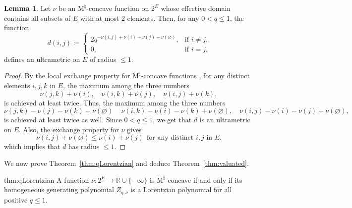 \documentclass{amsart}
\theoremstyle{definition}
\newtheorem{lemma}[theorem]{Lemma}
\theoremstyle{remark}
\newcommand{\1}{\mathbf{1}}
\newcommand{\Mnat}{$\text{M}^\natural$}
\numberwithin{equation}{section}
\begin{document}
\begin{lemma}\label{lem:ultra}
Let $\nu$ be an \Mnat-concave function on $2^E$ whose effective domain contains all subsets of $E$ with at most $2$ elements. Then,  for any $0<q\leq 1$, the function
  \[
  d(i,j)\coloneqq 
  \begin{cases}
  2q^{-\nu(i,j)+\nu(i)+\nu(j)-\nu(\varnothing)}, & \text{if $i\neq j$,}\\
  0, & \text{if $i=j$,}
  \end{cases}
  \]
  defines an ultrametric on $E$ of radius $\le 1$. %
\end{lemma}
\begin{proof}
  By the local exchange property for \Mnat-concave functions \cite[Theorem 6.4]{Mu03}, for any distinct elements $i,j,k$ in $E$, the maximum among the three numbers
  \[
    \nu(j,k)+\nu(i), \quad \nu(i,k)+\nu(j), \quad \nu(i,j)+\nu(k),
  \]
  is achieved at least twice. Thus, the maximum among the three numbers
  \[
    \nu(j,k) -\nu(j)-\nu(k) + \nu(\varnothing)\, \quad \nu(i,k) -\nu(i)-\nu(k) + \nu(\varnothing), \quad \nu(i,j) -\nu(i)-\nu(j) + \nu(\varnothing),
  \]
  is achieved at least twice as well. Since $0 < q \leq 1$, we get that $d$ is an ultrametric on $E$. 
  Also, the exchange property for $\nu$ gives
  \[
\nu(i,j)+\nu(\varnothing) \le \nu(i)+\nu(j) \ \ \text{for any distinct $i, j$ in $E$.}
  \]
which implies that $d$ has radius $\le 1$.
\end{proof}




We now prove Theorem~\ref{thm:qLorentzian} and deduce Theorem~\ref{thm:valuated}.
\begin{reptheorem}{thm:qLorentzian}
A function $\nu: 2^{E} \to \mathbb{R} \cup \{-\infty\}$ is \Mnat-concave if and only if its homogeneous generating polynomial
$Z_{q,\nu}$ is a Lorentzian polynomial for all positive $q \le 1$.
\end{reptheorem}
\end{document}
